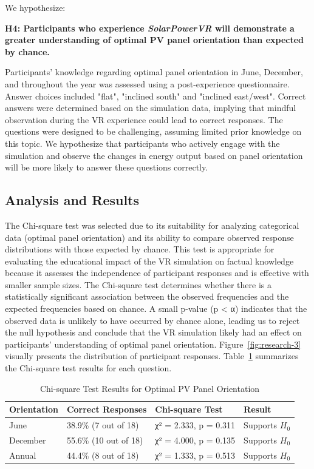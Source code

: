 \documentclass[draft, final]{vutinfth} %
\begin{document}
We hypothesize:

\textbf{H4: Participants who experience \textit{SolarPowerVR} will demonstrate a greater understanding of optimal PV panel orientation than expected by chance.}

Participants' knowledge regarding optimal panel orientation in June, December, and throughout the year was assessed using a post-experience questionnaire. Answer choices included "flat", "inclined south" and "inclined east/west". Correct answers were determined based on the simulation data, implying that mindful observation during the VR experience could lead to correct responses. The questions were designed to be challenging, assuming limited prior knowledge on this topic. We hypothesize that participants who actively engage with the simulation and observe the changes in energy output based on panel orientation will be more likely to answer these questions correctly.

\subsection{Analysis and Results}

The Chi-square test was selected due to its suitability for analyzing categorical data (optimal panel orientation) and its ability to compare observed response distributions with those expected by chance. This test is appropriate for evaluating the educational impact of the VR simulation on factual knowledge because it assesses the independence of participant responses and is effective with smaller sample sizes. The Chi-square test determines whether there is a statistically significant association between the observed frequencies and the expected frequencies based on chance. A small p-value (p < α) indicates that the observed data is unlikely to have occurred by chance alone, leading us to reject the null hypothesis and conclude that the VR simulation likely had an effect on participants' understanding of optimal panel orientation.
Figure~\ref{fig:research-3} visually presents the distribution of participant responses. Table~\ref{tab:chi-square-results} summarizes the Chi-square test results for each question.

\begin{table}[h]
    \centering
    \begin{tabular}{llll}
    \toprule
    \textbf{Orientation} & \textbf{Correct Responses} & \textbf{Chi-square Test} & \textbf{Result} \\
    \midrule
    June & 38.9\% (7 out of 18) & χ² = 2.333, p = 0.311 & Supports $H_0$ \\
    December & 55.6\% (10 out of 18) & χ² = 4.000, p = 0.135 & Supports $H_0$ \\
    Annual & 44.4\% (8 out of 18) & χ² = 1.333, p = 0.513 & Supports $H_0$ \\
    \bottomrule
    \end{tabular}
    \caption{Chi-square Test Results for Optimal PV Panel Orientation}
    \label{tab:chi-square-results}
\end{table}
\end{document}
